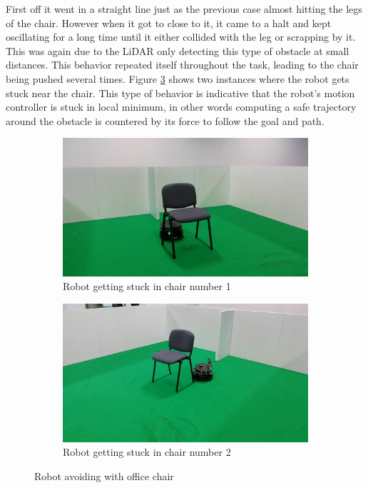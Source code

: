 First off it went in a straight line just as the previous case almost hitting  the legs of the chair. However when it got to close to it, it came to a halt and kept oscillating for a long time until it either collided with the leg or scrapping by it. This was again due to the \ac{LiDAR} only detecting this type of obstacle at small distances. This behavior repeated itself throughout the task, leading to the chair being pushed several times. Figure \ref{fig:nchairLF} shows two instances where the robot gets stuck near the chair. This type of behavior is indicative that the robot's motion controller is stuck in local minimum, in other words computing a safe trajectory around the obstacle is countered by its force to follow the goal and path.
\begin{figure}[h!]
  \centering
  \begin{subfigure}[b]{0.49\linewidth}
    \includegraphics[width=\linewidth]{imgs/chapter5/nchairLF.png}
     \caption{Robot getting stuck in chair number 1}
     \label{fig::wchair}
  \end{subfigure}
  \begin{subfigure}[b]{0.49\linewidth}
    \includegraphics[width=\linewidth]{imgs/chapter5/nchairLF2.png}
    \caption{Robot getting stuck in chair number 2}
    \label{fig::nchair}
  \end{subfigure}
  \caption{Robot avoiding with office chair}
  \label{fig:nchairLF}
\end{figure}

